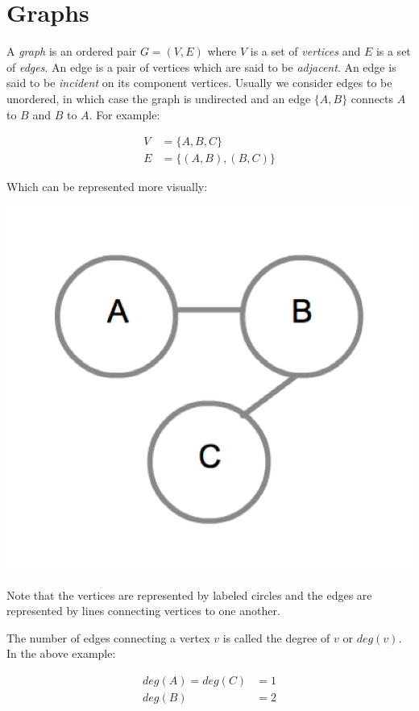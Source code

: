 \chapter{Graphs}

A \emph{graph} is an ordered pair $G=(V,E)$ where $V$ is a set of
\emph{vertices} and $E$ is a set of \emph{edges}.  An edge is a pair
of vertices which are said to be \emph{adjacent}.  An edge is said to
be \emph{incident} on its component vertices.  Usually we consider
edges to be unordered, in which case the graph is undirected and an
edge $\{A,B\}$ connects $A$ to $B$ and $B$ to $A$.  For example:

\begin{align*} 
V &= \{ A, B, C \} \\ E &= \{ (A, B), (B, C) \} 
\end{align*}

Which can be represented more visually:

{
  \includegraphics[scale=0.2]{SimpleGraph}
  \label{fig:SimpleGraph}
}

Note that the vertices are represented by labeled circles and the
edges are represented by lines connecting vertices to one another.

The number of edges connecting a vertex $v$ is called the degree of
$v$ or $deg(v)$.  In the above example:

\begin{align*}
deg(A) = deg(C) &= 1 \\
deg(B) &= 2
\end{align*}

